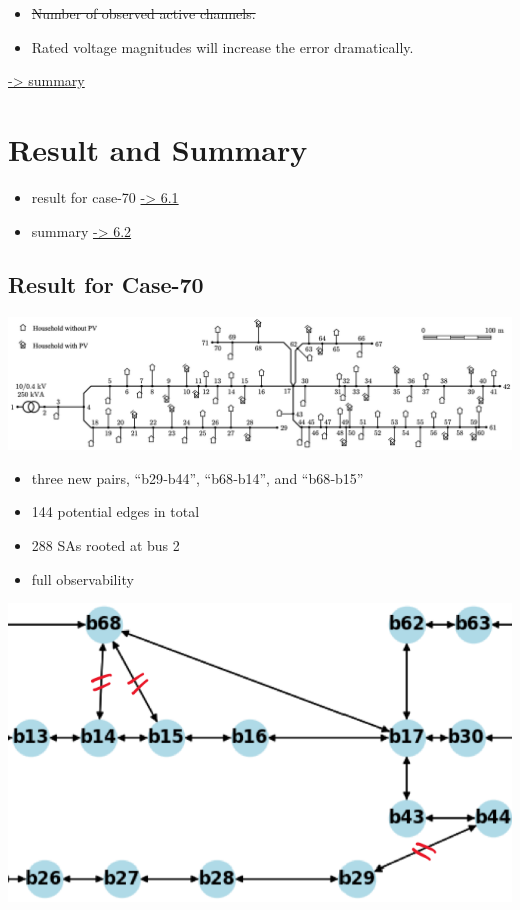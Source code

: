 \documentclass[
]{book}
\providecommand{\tightlist}{%
  \setlength{\itemsep}{0pt}\setlength{\parskip}{0pt}}
\begin{document}
\begin{itemize}
\tightlist
\item
  \sout{Number of observed active channels.}
\item
  Rated voltage magnitudes will increase the error dramatically.
\end{itemize}

\protect\hyperlink{summary}{-\textgreater{} summary}

\hypertarget{result-and-summary}{%
\chapter{Result and Summary}\label{result-and-summary}}

\begin{itemize}
\tightlist
\item
  result for case-70 \protect\hyperlink{result}{-\textgreater{} 6.1}
\item
  summary \protect\hyperlink{summary}{-\textgreater{} 6.2}
\end{itemize}

\hypertarget{result}{%
\section{Result for Case-70}\label{result}}

\includegraphics{Pictures/case70true.png}

\begin{itemize}
\tightlist
\item
  three new pairs, ``b29‐b44'', ``b68‐b14'', and ``b68‐b15''
\item
  144 potential edges in total
\item
  288 SAs rooted at bus 2
\item
  full observability
\end{itemize}

\begin{center}\includegraphics[width=0.55\linewidth]{Pictures/case70} \end{center}
\end{document}
